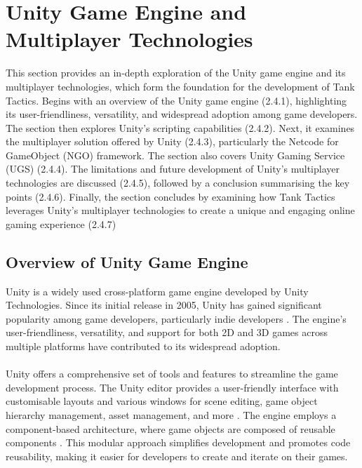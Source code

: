 \section{Unity Game Engine and Multiplayer Technologies}
This section provides an in-depth exploration of the Unity game engine and its multiplayer technologies, which form the foundation for the development of Tank Tactics. Begins with an overview of the Unity game engine (2.4.1), highlighting its user-friendliness, versatility, and widespread adoption among game developers. The section then explores Unity's scripting capabilities (2.4.2). Next, it examines the multiplayer solution offered by Unity (2.4.3), particularly the Netcode for GameObject (NGO) framework. The section also covers Unity Gaming Service (UGS) (2.4.4). The limitations and future development of Unity's multiplayer technologies are discussed (2.4.5), followed by a conclusion summarising the key points (2.4.6). Finally, the section concludes by examining how Tank Tactics leverages Unity's multiplayer technologies to create a unique and engaging online gaming experience (2.4.7)

\subsection{Overview of Unity Game Engine}
Unity is a widely used cross-platform game engine developed by Unity Technologies. Since its initial release in 2005, Unity has gained significant popularity among game developers, particularly indie developers \cite{game-engine}. The engine's user-friendliness, versatility, and support for both 2D and 3D games across multiple platforms have contributed to its widespread adoption.
\\
\noindent
\\
Unity offers a comprehensive set of tools and features to streamline the game development process. The Unity editor provides a user-friendly interface with customisable layouts and various windows for scene editing, game object hierarchy management, asset management, and more \cite{Unity-Tech2022.3d}. The engine employs a component-based architecture, where game objects are composed of reusable components \cite{Unity-Tech2022.3b}. This modular approach simplifies development and promotes code reusability, making it easier for developers to create and iterate on their games.

